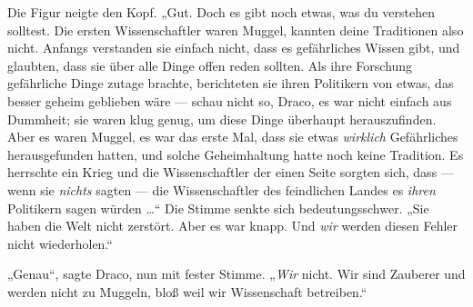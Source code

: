 Die Figur neigte den Kopf.
„Gut. Doch es gibt noch etwas, was du verstehen solltest. Die ersten Wissenschaftler waren Muggel, kannten deine Traditionen also nicht. Anfangs verstanden sie einfach nicht, dass es gefährliches Wissen gibt, und glaubten, dass sie über alle Dinge offen reden sollten. Als ihre Forschung gefährliche Dinge zutage brachte, berichteten sie ihren Politikern von etwas, das besser geheim geblieben wäre — schau nicht so, Draco, es war nicht einfach aus Dummheit; sie waren klug genug, um diese Dinge überhaupt herauszufinden. Aber es waren Muggel, es war das erste Mal, dass sie etwas \emph{wirklich} Gefährliches herausgefunden hatten, und solche Geheimhaltung hatte noch keine Tradition. Es herrschte ein Krieg und die Wissenschaftler der einen Seite sorgten sich, dass — wenn sie \emph{nichts} sagten — die Wissenschaftler des feindlichen Landes es \emph{ihren} Politikern sagen würden …“ Die Stimme senkte sich bedeutungsschwer.
„Sie haben die Welt nicht zerstört. Aber es war knapp. Und \emph{wir} werden diesen Fehler nicht wiederholen.“

„Genau“, sagte Draco, nun mit fester Stimme.
„\emph{Wir} nicht. Wir sind Zauberer und werden nicht zu Muggeln, bloß weil wir Wissenschaft betreiben.“

